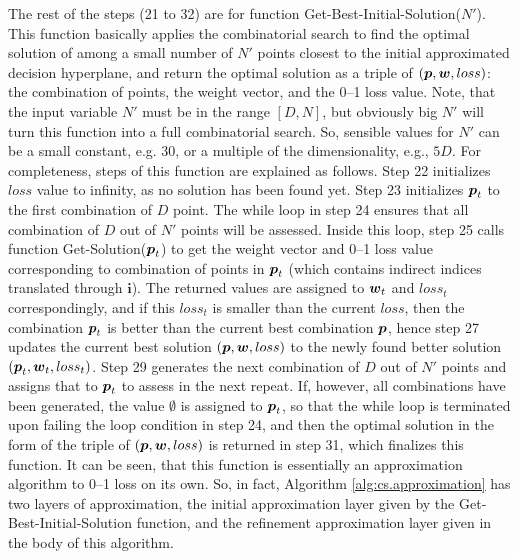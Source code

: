 The rest of the steps (21 to 32) are for function {\sc Get-Best-Initial-Solution($N'$)}. This function basically applies the combinatorial search to find the optimal solution of among a small number of $N'$ points closest to the initial approximated decision hyperplane, and return the optimal solution as a triple of $(\boldsymbol{p}, \boldsymbol{w}, loss)$: the combination of points, the weight vector, and the 0--1 loss value. Note, that the input variable $N'$ must be in the range $[D,N]$, but obviously big $N'$ will turn this function into a full combinatorial search. So, sensible values for $N'$ can be a small constant, e.g. $30$, or a multiple of the dimensionality, e.g., $5D$. For completeness, steps of this function are explained as follows. Step 22 initializes $loss$ value to infinity, as no solution has been found yet. Step 23 initializes $\boldsymbol{p}_t$ to the first combination of $D$ point. The while loop in step 24 ensures that all combination of $D$ out of $N'$ points will be assessed. Inside this loop, step 25 calls function {\sc Get-Solution($\boldsymbol{p}_t$)} to get the weight vector and 0--1 loss value corresponding to combination of points in $\boldsymbol{p}_t$ (which contains indirect indices translated through $\boldsymbol{i}$). The returned values are assigned to $\boldsymbol{w}_t$ and $loss_t$ correspondingly, and if this $loss_t$ is smaller than the current $loss$, then the combination $\boldsymbol{p}_t$ is better than the current best combination $\boldsymbol{p}$, hence step 27 updates the current best solution $(\boldsymbol{p}, \boldsymbol{w}, loss)$ to the newly found better solution $(\boldsymbol{p}_t, \boldsymbol{w}_t, loss_t)$. Step 29 generates the next combination of $D$ out of $N'$ points and assigns that to $\boldsymbol{p}_t$ to assess in the next repeat. If, however, all combinations have been generated, the value $\emptyset$ is assigned to $\boldsymbol{p}_t$, so that the while loop is terminated upon failing the loop condition in step 24, and then the optimal solution in the form of the triple of $(\boldsymbol{p}, \boldsymbol{w}, loss)$ is returned in step 31, which finalizes this function. It can be seen, that this function is essentially an approximation algorithm to 0--1 loss on its own. So, in fact, Algorithm \ref{alg:cs.approximation} has two layers of approximation, the initial approximation layer given by the {\sc Get-Best-Initial-Solution} function, and the refinement approximation layer given in the body of this algorithm.

